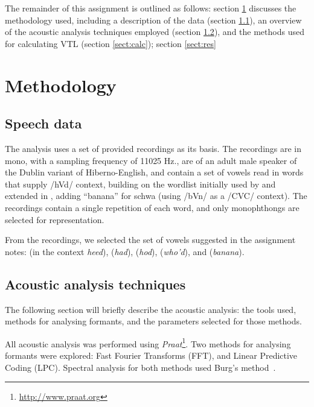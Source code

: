 \documentclass[11pt]{article}
\begin{document}
The remainder of this assignment is outlined as follows:
section \ref{sect:meth} discusses the methodology used, including a description of the data (section \ref{sect:data}), an overview of the acoustic analysis techniques employed (section \ref{sect:tech}), and the methods used for calculating VTL (section \ref{sect:calc}); section \ref{sect:res} 


\section{Methodology}
\label{sect:meth}
\subsection{Speech data}
\label{sect:data}

The analysis uses a set of provided recordings as its basis.
The recordings are in mono, with a sampling frequency of 11025 Hz., are of an adult male speaker of the Dublin variant of Hiberno-English, and contain a set of vowels read in words that supply /hVd/ context, building on the wordlist initially used by \citet[p. 175]{peterson1952control} and extended in \citet[p. 38]{ladefoged2010course}, adding ``banana'' for schwa (using /bVn/ as a /CVC/ context). The recordings contain a single repetition of each word, and only monophthongs are selected for representation. 

From the recordings, we selected the set of vowels suggested in the assignment notes:  (in the context \textit{heed}),  (\textit{had}),  (\textit{hod}),  (\textit{who'd}), and  (\textit{banana}).

\subsection{Acoustic analysis techniques}
\label{sect:tech}

The following section will briefly describe the acoustic analysis: the tools used, methods for analysing formants, and the parameters selected for those methods.

All acoustic analysis was performed using \textit{Praat}\footnote{\url{http://www.praat.org}}. Two methods for analysing formants were explored: Fast Fourier Transforms (FFT), and Linear Predictive Coding (LPC). Spectral analysis for both methods used Burg's method~\citep{burg1975maxent}.
\end{document}
